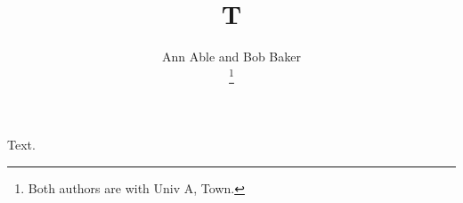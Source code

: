 \documentclass{article}
\title{T}
\author{Ann Able and Bob Baker\\
\thanks{Both authors are with Univ A, Town.}}
\begin{document}
\maketitle
Text.
\end{document}
